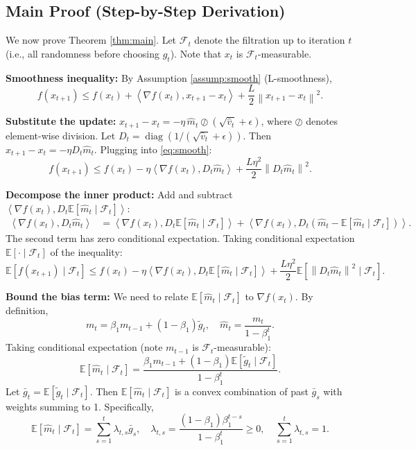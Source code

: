 \documentclass{article}
\newcommand{\E}{\mathbb{E}}
\newcommand{\norm}[1]{\left\| #1 \right\|}
\newcommand{\inner}[2]{\left\langle #1, #2 \right\rangle}
\newcommand{\step}[1]{\text{[Step #1]}}
\begin{document}
\subsection*{Main Proof (Step-by-Step Derivation)}

We now prove Theorem \ref{thm:main}. Let $\mathcal{F}_t$ denote the filtration up to iteration $t$ (i.e., all randomness before choosing $g_t$). Note that $x_t$ is $\mathcal{F}_t$-measurable.

\step{1} \textbf{Smoothness inequality:} By Assumption \ref{assump:smooth} (L-smoothness),
\begin{equation} \label{eq:smooth}
    f(x_{t+1}) \le f(x_t) + \inner{\nabla f(x_t)}{x_{t+1} - x_t} + \frac{L}{2} \norm{x_{t+1} - x_t}^2.
\end{equation}

\step{2} \textbf{Substitute the update:} $x_{t+1} - x_t = -\eta \, \hat{m}_t \oslash (\sqrt{\hat{v}_t} + \epsilon)$, where $\oslash$ denotes element-wise division. Let $D_t = \operatorname{diag}(1/(\sqrt{\hat{v}_t} + \epsilon))$. Then $x_{t+1} - x_t = -\eta D_t \hat{m}_t$. Plugging into \eqref{eq:smooth}:
\begin{equation}
    f(x_{t+1}) \le f(x_t) - \eta \inner{\nabla f(x_t)}{D_t \hat{m}_t} + \frac{L \eta^2}{2} \norm{D_t \hat{m}_t}^2.
\end{equation}

\step{3} \textbf{Decompose the inner product:} Add and subtract $\inner{\nabla f(x_t)}{D_t \E[\hat{m}_t \mid \mathcal{F}_t]}$:
\begin{align}
    \inner{\nabla f(x_t)}{D_t \hat{m}_t}
    &= \inner{\nabla f(x_t)}{D_t \E[\hat{m}_t \mid \mathcal{F}_t]} + \inner{\nabla f(x_t)}{D_t (\hat{m}_t - \E[\hat{m}_t \mid \mathcal{F}_t])}.
\end{align}
The second term has zero conditional expectation. Taking conditional expectation $\E[\cdot \mid \mathcal{F}_t]$ of the inequality:
\begin{equation} \label{eq:exp_smooth}
    \E[f(x_{t+1}) \mid \mathcal{F}_t] \le f(x_t) - \eta \inner{\nabla f(x_t)}{D_t \E[\hat{m}_t \mid \mathcal{F}_t]} + \frac{L \eta^2}{2} \E[\norm{D_t \hat{m}_t}^2 \mid \mathcal{F}_t].
\end{equation}

\step{4} \textbf{Bound the bias term:} We need to relate $\E[\hat{m}_t \mid \mathcal{F}_t]$ to $\nabla f(x_t)$. By definition,
\[
    m_t = \beta_1 m_{t-1} + (1-\beta_1) \tilde{g}_t, \quad \hat{m}_t = \frac{m_t}{1-\beta_1^t}.
\]
Taking conditional expectation (note $m_{t-1}$ is $\mathcal{F}_t$-measurable):
\[
    \E[\hat{m}_t \mid \mathcal{F}_t] = \frac{\beta_1 m_{t-1} + (1-\beta_1) \E[\tilde{g}_t \mid \mathcal{F}_t]}{1-\beta_1^t}.
\]
Let $\bar{g}_t = \E[\tilde{g}_t \mid \mathcal{F}_t]$. Then $\E[\hat{m}_t \mid \mathcal{F}_t]$ is a convex combination of past $\bar{g}_s$ with weights summing to 1. Specifically,
\[
    \E[\hat{m}_t \mid \mathcal{F}_t] = \sum_{s=1}^t \lambda_{t,s} \bar{g}_s, \quad \lambda_{t,s} = \frac{(1-\beta_1)\beta_1^{t-s}}{1-\beta_1^t} \ge 0, \quad \sum_{s=1}^t \lambda_{t,s} = 1.
\]
\end{document}
